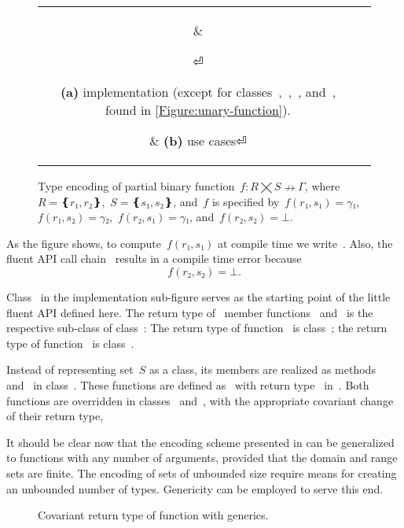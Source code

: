 \begin{figure}[hbt]
  \caption{\label{Figure:simple-binary}%
    Type encoding of partial binary function~$f:R⨉S↛Γ$,
    where~$R=❴r₁,r₂❵$,~$S=❴s₁,s₂❵$, and~$f$
    is specified by~$f(r₁,s₁)=γ₁$,~$f(r₁,s₂)=γ₂$,~$f(r₂,s₁)=γ₁$, and~$f(r₂, s₂)=⊥$.}
  \begin{tabular}{cc}
    \hspace{-3.5ex}
    \parbox[c]{0.57\linewidth}{%
    }
      &
    \hspace{-16ex}
    \parbox[c]{51ex}{}
⏎
    \parbox{0.57\linewidth}
    {\textbf{(a)} implementation (except for classes~,~,~, and~,
    found in \cref{Figure:unary-function}).}
      & \hspace{-5ex}\textbf{(b)} use cases⏎
  \end{tabular}
\end{figure}

As the figure shows, to compute~$f(r₁,s₁)$ at compile time we write~.
Also, the fluent API call chain~ results in a compile time
error because 
\[
    f(r₂, s₂)=⊥.
\]

Class~ in the implementation sub-figure serves as
  the starting point of the little fluent API defined here.
The return type of~ member functions~ and~
  is the respective sub-class of class~:
The return type of function~ is class~;
  the return type of function~ is class~.

Instead of representing set~$S$ as a class,
  its members are realized as methods~ and~ in class~.
These functions are defined as~ with return type~
  in~.
Both functions are overridden in classes~ and~,
   with the appropriate covariant change of their return type,

It should be clear now that the encoding scheme presented
  in  can be generalized to functions
  with any number of arguments, provided that the domain and range sets are finite.
The encoding of sets of unbounded size require means for creating an unbounded
 number of types.
Genericity can be employed to serve this end.

\begin{wrapfigure}[8]{r}{31ex}
  \intextsep=0pt
  \caption{\label{Figure:id}%
  Covariant return type of function 
  with \Java generics.
  }
\end{wrapfigure}

